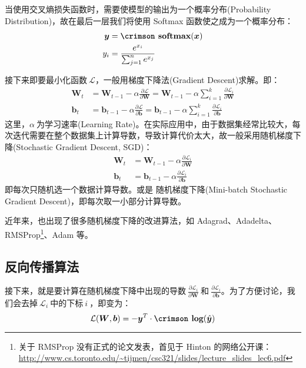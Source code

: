 \documentclass[12pt,a4paper]{article}
\begin{document}
当使用交叉熵损失函数时，需要使模型的输出为一个{\hei 概率分布}({\crimson Probability Distribution})，故在最后一层我们将使用 {\crimson Softmax} 函数使之成为一个概率分布：
\begin{equation}
\begin{split}
\bm{y} &= \textbf{\crimson softmax}(\bm{x}) \\
y_i &= \frac{e^{x_i}}{\sum^n_{j = 1}e^{x_j}}
\end{split}
\end{equation}

接下来即要最小化函数$\:\mathcal{L}$，一般用{\hei 梯度下降法}({\crimson Gradient Descent})求解。即：
\begin{align}
\bm{W}_t &= \bm{W}_{t-1} - \alpha\frac{\partial \mathcal{L}}{\partial \bm{W}} =  \bm{W}_{t-1} - \alpha\sum_{i=1}^{k} \frac{\partial \mathcal{L}_i}{\partial \bm{W}}\\
\bm{b}_t &= \bm{b}_{t-1} - \alpha\frac{\partial \mathcal{L}}{\partial \bm{b}} =  \bm{b}_{t-1} - \alpha\sum_{i=1}^{k} \frac{\partial \mathcal{L}_i}{\partial \bm{b}}
\end{align}
这里，$\alpha\:$为{\hei 学习速率}({\crimson Learning Rate})。在实际应用中，由于数据集经常比较大，每次迭代需要在整个数据集上计算导数，导致计算代价太大，故一般采用{\hei 随机梯度下降}({\crimson Stochastic Gradient Descent, SGD})：
\begin{align}
\bm{W}_t &= \bm{W}_{t-1} - \alpha\frac{\partial \mathcal{L}_i}{\partial \bm{W}}\\
\bm{b}_t &= \bm{b}_{t-1} - \alpha\frac{\partial \mathcal{L}_i}{\partial \bm{b}}
\end{align}
即每次只随机选一个数据计算导数。或是 { 随机梯度下降}({\crimson Mini-batch Stochastic Gradient Descent})，即每次取一小部分计算导数。

近年来，也出现了很多随机梯度下降的改进算法，如 {\crimson Adagrad}{\kai \cite{duchi2011adaptive}}、{\crimson Adadelta}{\kai \cite{zeiler2012adadelta}}、
{\crimson RMSProp}\footnote{\hei 关于 {\crimson RMSProp} 没有正式的论文发表，首见于 {\crimson Hinton} 的网络公开课：\url{http://www.cs.toronto.edu/~tijmen/csc321/slides/lecture_slides_lec6.pdf}}、{\crimson Adam}{\kai \cite{kingma2014adam}} 等。

\subsection{反向传播算法}

接下来，就是要计算在随机梯度下降中出现的导数$\:\frac{\partial \mathcal{L}_i}{\partial \bm{W}}\:$和$\:\frac{\partial \mathcal{L}_i}{\partial \bm{b}}$。为了方便讨论，我们会去掉$\:\mathcal{L}_i\:$中的下标$\:i\:$，即变为：
\begin{equation}
\mathcal{L}(\bm{W},\bm{b}) =  -\bm{y}^{T}\cdot\textbf{\crimson log}(\hat{\bm{y}})
\end{equation}
\end{document}
